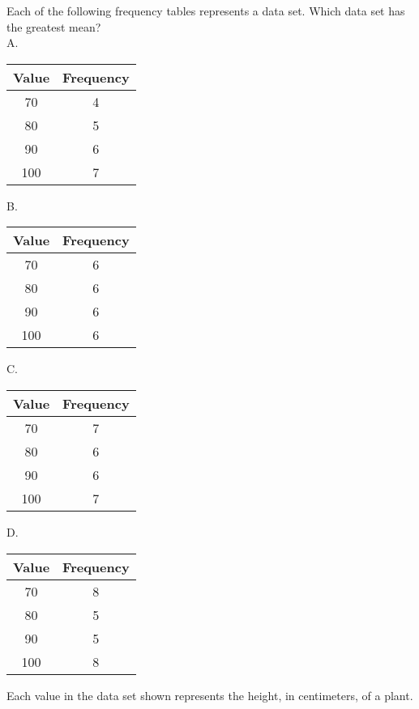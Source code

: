 Each of the following frequency tables represents a data set. Which data set has the greatest mean?\\
A.

\begin{center}
\begin{tabular}{|c|c|}
\hline
Value & Frequency \\
\hline
70 & 4 \\
\hline
80 & 5 \\
\hline
90 & 6 \\
\hline
100 & 7 \\
\hline
\end{tabular}
\end{center}

B.

\begin{center}
\begin{tabular}{|c|c|}
\hline
Value & Frequency \\
\hline
70 & 6 \\
\hline
80 & 6 \\
\hline
90 & 6 \\
\hline
100 & 6 \\
\hline
\end{tabular}
\end{center}

C.

\begin{center}
\begin{tabular}{|c|c|}
\hline
Value & Frequency \\
\hline
70 & 7 \\
\hline
80 & 6 \\
\hline
90 & 6 \\
\hline
100 & 7 \\
\hline
\end{tabular}
\end{center}

D.

\begin{center}
\begin{tabular}{|c|c|}
\hline
Value & Frequency \\
\hline
70 & 8 \\
\hline
80 & 5 \\
\hline
90 & 5 \\
\hline
100 & 8 \\
\hline
\end{tabular}
\end{center}

Each value in the data set shown represents the height, in centimeters, of a plant.

